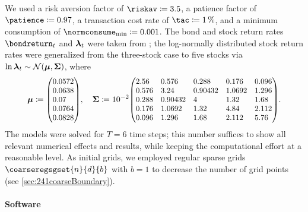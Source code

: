 We used
a risk aversion factor of $\riskav \ceq 3.5$,
a patience factor of $\patience \ceq 0.97$,
a transaction cost rate of $\tac \ceq \SI{1}{\percent}$, and
a minimum consumption of $\normconsume_{\min} \ceq 0.001$.
The bond and stock return rates $\bondreturn_t$ and ${\boldsymbol{\lambda}}_t$
were taken from \cite{Cai10Stable};
the log-normally distributed stock return rates were generalized
from the three-stock case to five stocks via
$\ln {\boldsymbol{\lambda}}_t \sim \mathcal{N}({\boldsymbol{\mu}}, {\boldsymbol{\Sigma}})$, where
{%
  \setlength{\abovedisplayskip}{6pt}%
  \setlength{\belowdisplayskip}{6pt}%
  \begin{equation}
    \label{eq:financeStockReturnMeanCovariance}
    \*\mu
    \ceq
    \scalebox{0.92}{$
      \begin{pmatrix*}[l]
        0.0572\\
        0.0638\\
        0.07\\
        0.0764\\
        0.0828
      \end{pmatrix*}
    $},\quad
    \mat{\Sigma}
    \ceq 10^{-2}
    \scalebox{0.92}{$
      \begin{pmatrix*}[l]
        2.56&  0.576&   0.288&   0.176&  0.096\\
        0.576& 3.24&    0.90432& 1.0692& 1.296\\
        0.288& 0.90432& 4&       1.32&   1.68\\
        0.176& 1.0692&  1.32&    4.84&   2.112\\
        0.096& 1.296&   1.68&    2.112&  5.76
      \end{pmatrix*}
    $}.
  \end{equation}%
}%
The models were solved for $T = 6$ time steps;
this number suffices to show all relevant numerical effects and results,
while keeping the computational effort at a reasonable level.
As initial grids, we employed regular sparse grids
$\coarseregsgset{n}{d}{b}$ with $b = 1$
to decrease the number of grid points
(see \cref{sec:241coarseBoundary}).

\vspace*{0.25em}

\paragraph{Software}

